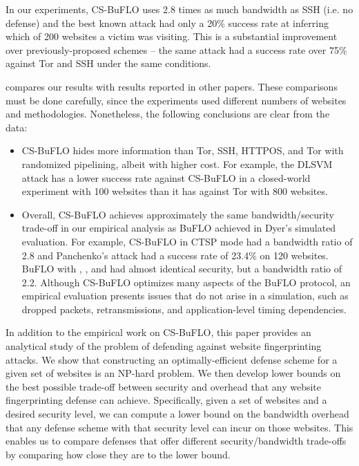 \documentclass[10pt,journal]{IEEEtran}
\newcommand{\buflo} {BuFLO\xspace}
\newcommand{\csb} {CS-BuFLO\xspace}
\begin{document}
In our experiments, \csb uses 2.8 times as much bandwidth as SSH (i.e. no
defense) and the best known attack had only a 20\% success rate at
inferring which of 200 websites a victim was visiting.  This is a
substantial improvement over previously-proposed schemes -- the same
attack had a success rate over 75\% against Tor and SSH under the same
conditions.

 compares our results with results reported in
other papers.  These comparisons must be done carefully, since the
experiments used different numbers of websites and methodologies.
Nonetheless, the following conclusions are clear from the data:
\begin{itemize}
  \item \csb hides more information than Tor, SSH, HTTPOS, and Tor
    with randomized pipelining, albeit with higher cost. For example,
    the DLSVM attack has a lower success rate against \csb in a
    closed-world experiment with 100 websites than it has against Tor
    with 800 websites.
    
  \item Overall, \csb achieves approximately the same
    bandwidth/security trade-off in our empirical analysis as \buflo
    achieved in Dyer's simulated evaluation.  For example, \csb in
    CTSP mode had a bandwidth ratio of 2.8 and Panchenko's attack had
    a success rate of 23.4\% on 120 websites.  \buflo with , 
    , and  had almost identical security, but a
    bandwidth ratio of 2.2.  Although \csb optimizes many aspects of
    the \buflo protocol, an empirical evaluation presents issues that
    do not arise in a simulation, such as dropped packets,
    retransmissions, and application-level timing dependencies.
\end{itemize}

In addition to the empirical work on \csb, this paper provides an
analytical study of the problem of defending against website
fingerprinting attacks.  We show that constructing an
optimally-efficient defense scheme for a given set of websites is an
NP-hard problem.  We then develop lower bounds on the best possible
trade-off between security and overhead that any website
fingerprinting defense can achieve.  Specifically, given a set of
websites and a desired security level, we can compute a lower bound on
the bandwidth overhead that any defense scheme with that security
level can incur on those websites.  This enables us to compare
defenses that offer different security/bandwidth trade-offs by
comparing how close they are to the lower bound.
\end{document}
